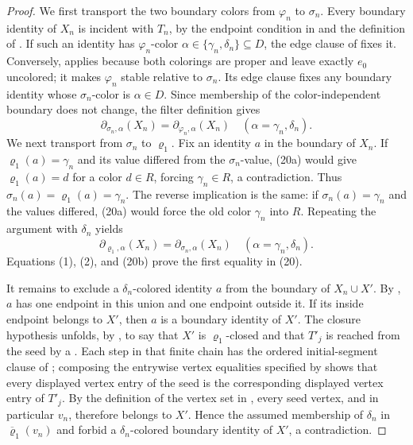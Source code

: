 \begin{proof}
We first transport the two boundary colors from \(\varphi_n\) to
\(\sigma_n\).  Every boundary identity of \(X_n\) is incident with
\(T_n\), by the endpoint condition in  and the
definition of .  If such an identity has
\(\varphi_n\)-color \(\alpha\in\{\gamma_n,\delta_n\}\subseteq D\),
the edge clause of  fixes it.  Conversely,
 applies because both colorings are proper and leave exactly
\(e_0\) uncolored; it makes \(\varphi_n\) stable relative to
\(\sigma_n\).  Its edge clause fixes any boundary identity whose
\(\sigma_n\)-color is \(\alpha\in D\).  Since membership of the
color-independent boundary does not change, the filter definition
 gives
\[
 \partial_{\sigma_n,\alpha}(X_n)
   =\partial_{\varphi_n,\alpha}(X_n)
 \quad(\alpha=\gamma_n,\delta_n).                              \tag{1}
\]
We next transport from \(\sigma_n\) to \(\varrho_1\).  Fix an identity
\(a\) in the boundary of \(X_n\).  If
\(\varrho_1(a)=\gamma_n\) and its value differed from the
\(\sigma_n\)-value, (20a) would give
\(\varrho_1(a)=d\) for a color \(d\in R\), forcing
\(\gamma_n\in R\), a contradiction.  Thus
\(\sigma_n(a)=\varrho_1(a)=\gamma_n\).  The reverse implication is the
same: if \(\sigma_n(a)=\gamma_n\) and the values differed, (20a) would
force the old color \(\gamma_n\) into \(R\).  Repeating the argument
with \(\delta_n\) yields
\[
 \partial_{\varrho_1,\alpha}(X_n)
   =\partial_{\sigma_n,\alpha}(X_n)
 \quad(\alpha=\gamma_n,\delta_n).                              \tag{2}
\]
Equations (1), (2), and (20b) prove the first equality in (20).

It remains to exclude a \(\delta_n\)-colored identity \(a\) from the
boundary of \(X_n\cup X'\).  By , \(a\) has one
endpoint in this union and one endpoint outside it.  If its inside
endpoint belongs to \(X'\), then \(a\) is a boundary identity of \(X'\).
The closure hypothesis unfolds, by , to say
that \(X'\) is \(\varrho_1\)-closed and that \(T'_j\) is reached from
the seed by a .  Each step in
that finite chain has the ordered initial-segment clause of
; composing the entrywise vertex equalities
specified by  shows that every displayed
vertex entry of the seed is the corresponding displayed vertex entry of
\(T'_j\).  By the definition of the vertex set in
, every seed vertex, and in particular
\(v_n\), therefore belongs to \(X'\).  Hence the
assumed membership of \(\delta_n\) in
\(\overline{\varrho}_1(v_n)\) and
 forbid a \(\delta_n\)-colored boundary
identity of \(X'\), a contradiction.


\end{proof}
